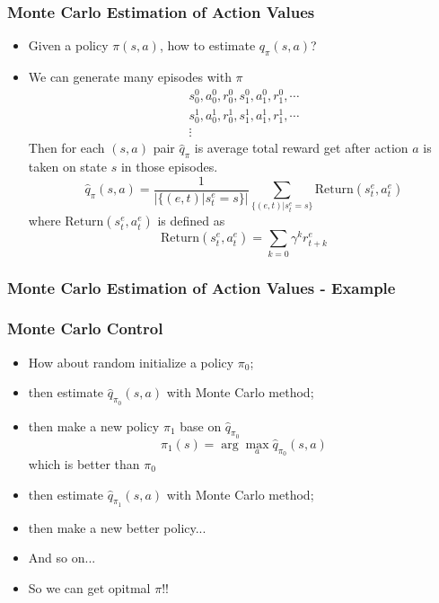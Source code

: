 \begin{frame}
  \frametitle{Monte Carlo Estimation of Action Values}
  \begin{itemize}
  \item Given a policy $\pi(s, a)$, how to estimate $q_\pi(s, a)$?
  \item We can generate many episodes with $\pi$
    \begin{align*}
      s^0_0, a^0_0, r^0_0, s^0_1, a^0_1, r^0_1, \cdots \\
      s^1_0, a^1_0, r^1_0, s^1_1, a^1_1, r^1_1, \cdots \\
      \vdots
    \end{align*}
    Then for each $(s, a)$ pair $\hat{q}_\pi$ is average total reward get after action $a$ is taken on state $s$ in those episodes.
    \begin{equation*}
      \hat{q}_\pi(s, a) = \frac{1}{|\{(e, t) | s^{e}_{t} = s\}|} \sum_{\{(e, t) | s^{e}_{t} = s\}} \mathrm{Return}(s^e_t, a^e_t)
    \end{equation*}
    where $\mathrm{Return}(s^e_t, a^e_t)$ is defined as
    \begin{equation*}
      \mathrm{Return}(s^e_t, a^e_t) = \sum_{k=0} \gamma^{k} r^e_{t + k}
    \end{equation*}
  \end{itemize}
\end{frame}

\begin{frame}
  \frametitle{Monte Carlo Estimation of Action Values - Example}
  
\end{frame}



\begin{frame}
  \frametitle{Monte Carlo Control}
  \begin{itemize}
  \item How about random initialize a policy $\pi_0$;
  \item then estimate $\hat{q}_{\pi_0}(s, a)$ with Monte Carlo method;
  \item then make a new policy $\pi_1$ base on $\hat{q}_{\pi_0}$
    \begin{equation*}
      \pi_1(s) = \arg \max_a \hat{q}_{\pi_0}(s, a) 
    \end{equation*}
    which is better than $\pi_0$
  \item then estimate $\hat{q}_{\pi_1}(s, a)$ with Monte Carlo method;
  \item then make a new better policy...
  \item And so on...
  \item So we can get opitmal $\pi$!!
  \end{itemize}
\end{frame}


